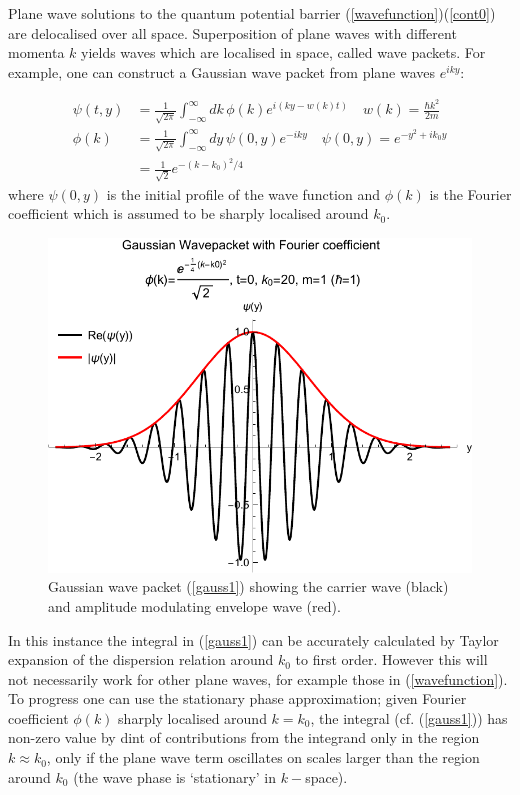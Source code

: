 \documentclass{article}
\begin{document}
Plane wave solutions to the quantum potential barrier (\ref{wavefunction})(\ref{cont0}) are delocalised over all space. Superposition of plane waves with different momenta $k$ yields waves which are localised in space, called wave packets. For example, one can construct a Gaussian wave packet from plane waves $e^{iky}$:

\begin{subequations}
\begin{align}
	\psi(t,y)&=\frac{1}{\sqrt{2\pi}}\int_{-\infty}^{\infty}dk\,\phi(k)e^{i(ky-w(k)t)} \quad w(k)=\frac{\hbar k^2}{2m} \label{gauss1}\\
	\phi(k)&=\frac{1}{\sqrt{2\pi}}\int_{-\infty}^{\infty}dy\,\psi(0,y)e^{-iky} \quad \psi(0,y) = e^{-y^2+ik_0y}\\
	&= \frac{1}{\sqrt{2}}e^{-(k-k_0)^2/4}
	\end{align}
\end{subequations}
\noindent where $\psi(0,y)$ is the initial profile of the wave function and $\phi(k)$ is the Fourier coefficient which is assumed to be sharply localised around $k_0$. 

\begin{figure}[ht]
\centering
\includegraphics{plot4.pdf}
\caption{Gaussian wave packet (\ref{gauss1}) showing the carrier wave (black) and amplitude modulating envelope wave (red).}
\end{figure}

\noindent In this instance the integral in (\ref{gauss1}) can be accurately calculated by Taylor expansion of the dispersion relation around $k_0$ to first order. However this will not necessarily work for other plane waves, for example those in (\ref{wavefunction}). To progress one can use the stationary phase approximation; given Fourier coefficient $\phi(k)$ sharply localised around $k=k_0$, the integral (cf. (\ref{gauss1})) has non-zero value by dint of contributions from the integrand only in the region $k\approx k_0$, only if the plane wave term oscillates on scales larger than the region around $k_0$ (the wave phase is `stationary' in $k-$space). 
\end{document}
